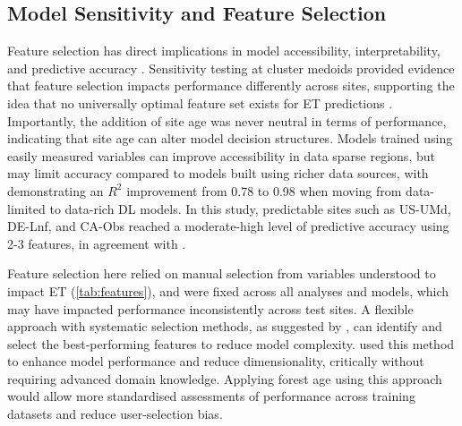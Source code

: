 \subsection{Model Sensitivity and Feature Selection}
Feature selection has direct implications in model accessibility, interpretability, and predictive accuracy \parencite{liyew2025review}. Sensitivity testing at cluster medoids provided evidence that feature selection impacts performance differently across sites, supporting the idea that no universally optimal feature set exists for ET predictions \parencite{liyew2025review}. Importantly, the addition of site age was never neutral in terms of performance, indicating that site age can alter model decision structures. Models trained using easily measured variables can improve accessibility in data sparse regions, but may limit accuracy compared to models built using richer data sources, with \textcite{nayak2026estimation} demonstrating an $R^2$ improvement from 0.78 to 0.98 when moving from data-limited to data-rich \ac{DL} models. In this study, predictable sites such as US-UMd, DE-Lnf, and CA-Obs reached a moderate-high level of predictive accuracy using 2-3 features, in agreement with \textcite{nayak2026estimation}. 
\par Feature selection here relied on manual selection from variables understood to impact ET (\autoref{tab:features}), and were fixed across all analyses and models, which may have impacted performance inconsistently across test sites. A flexible approach with systematic selection methods, as suggested by \textcite{liyew2025review}, can identify and select the best-performing features to reduce model complexity. \textcite{stapleton2022framework} used this method to enhance model performance and reduce dimensionality, critically without requiring advanced domain knowledge. Applying forest age using this approach would allow more standardised assessments of performance across training datasets and reduce user-selection bias.




